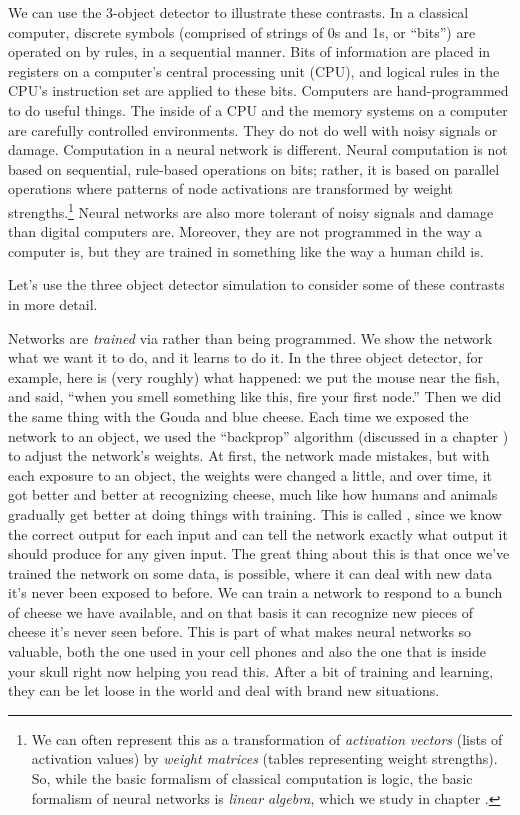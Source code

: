 We can use the 3-object detector to illustrate these contrasts. In a classical computer, discrete symbols (comprised of strings of 0s and 1s, or ``bits'') are operated on by rules, in a sequential manner. Bits of information are placed in registers on a computer's central processing unit (CPU), and logical rules in the CPU's instruction set are applied to these bits. Computers are hand-programmed to do useful things. The inside of a CPU and the memory systems on a computer are carefully controlled environments. They do not do well with noisy signals or damage. Computation in a neural network is  different. Neural computation is not based on sequential, rule-based operations on bits; rather, it is based on parallel operations where patterns of node activations are transformed by weight strengths.\footnote{We can often represent this as a transformation of \emph{activation vectors} (lists of activation values) by \emph{weight matrices} (tables representing weight strengths). So, while the basic formalism of classical computation is logic,  the basic formalism of neural networks is \emph{linear algebra}, which we study in chapter .}  Neural networks are also more tolerant of noisy signals and damage than digital computers are. Moreover, they are not programmed in the way a computer is, but they are trained in something like the way a human child is.

Let's use the three object detector simulation to consider some of these contrasts in more detail. 

Networks are \emph{trained} via  rather than being programmed. We show the network what we want it to do, and it learns to do it. In the three object detector, for example, here is (very roughly) what happened: we put the mouse near the fish, and said, ``when you smell something like this, fire your first node.''  Then we did the same thing with the Gouda and blue cheese. Each time we exposed the network to an object, we used the ``backprop'' algorithm (discussed in a chapter ) to adjust the network's weights. At first, the network made mistakes, but with each exposure to an object, the weights were changed a little, and over time, it got better and better at recognizing cheese, much like how humans and animals gradually get better at doing things with training. This is called , since we know the correct output for each input and can tell the network exactly what output it should produce for any given input.  The great thing about this is that once we've trained the network on some data,  is possible, where it can deal with new data it's never been exposed to before. We can train a network to respond to a bunch of cheese we have available, and on that basis it can recognize new pieces of cheese it's never seen before. This is part of what makes neural networks so valuable, both the one used in your cell phones and also the one that is inside your skull right now helping you read this. After a bit of training and learning, they can be let loose in the world and deal with brand new situations.

